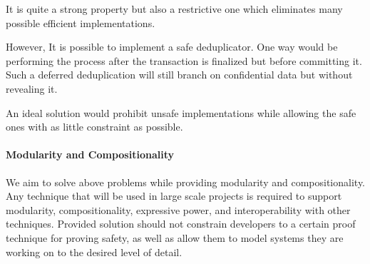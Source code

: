 It is quite a strong property but also a restrictive one which eliminates many possible efficient implementations.

However, It is possible to implement a safe deduplicator. One way would be performing the process after the transaction is finalized but before committing it. Such a deferred deduplication will still branch on confidential data but without revealing it.

An ideal solution would prohibit unsafe implementations while allowing the safe ones with as little constraint as possible.  


\paragraph{Modularity and Compositionality}
We aim to solve above problems while providing modularity and compositionality. Any technique that will be used in large scale projects is required to support modularity, compositionality, expressive power, and interoperability with other techniques. Provided solution should not constrain developers to a certain proof technique for proving safety, as well as allow them to model systems they are working on to the desired level of detail. 



